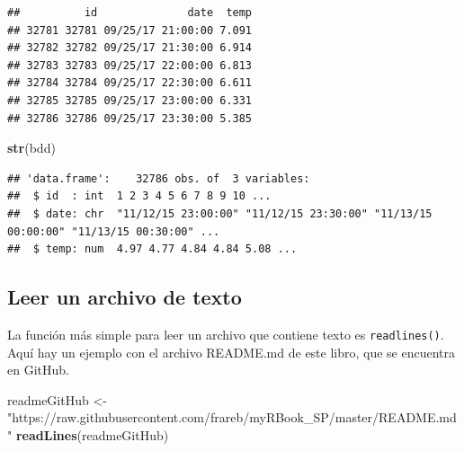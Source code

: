 \documentclass[
]{book}
\newenvironment{Shaded}{\begin{snugshade}}{\end{snugshade}}
\newcommand{\KeywordTok}[1]{\textcolor[rgb]{0.13,0.29,0.53}{\textbf{#1}}}
\newcommand{\NormalTok}[1]{#1}
\newcommand{\StringTok}[1]{\textcolor[rgb]{0.31,0.60,0.02}{#1}}
\begin{document}
\begin{verbatim}
##          id              date  temp
## 32781 32781 09/25/17 21:00:00 7.091
## 32782 32782 09/25/17 21:30:00 6.914
## 32783 32783 09/25/17 22:00:00 6.813
## 32784 32784 09/25/17 22:30:00 6.611
## 32785 32785 09/25/17 23:00:00 6.331
## 32786 32786 09/25/17 23:30:00 5.385
\end{verbatim}

\begin{Shaded}
\begin{Highlighting}[]
\KeywordTok{str}\NormalTok{(bdd)}
\end{Highlighting}
\end{Shaded}

\begin{verbatim}
## 'data.frame':    32786 obs. of  3 variables:
##  $ id  : int  1 2 3 4 5 6 7 8 9 10 ...
##  $ date: chr  "11/12/15 23:00:00" "11/12/15 23:30:00" "11/13/15 00:00:00" "11/13/15 00:30:00" ...
##  $ temp: num  4.97 4.77 4.84 4.84 5.08 ...
\end{verbatim}

\hypertarget{l016readTXT}{%
\subsection{Leer un archivo de texto}\label{l016readTXT}}

La función más simple para leer un archivo que contiene texto es \texttt{readlines()}. Aquí hay un ejemplo con el archivo README.md de este libro, que se encuentra en GitHub.

\begin{Shaded}
\begin{Highlighting}[]
\NormalTok{readmeGitHub <-}\StringTok{ "https://raw.githubusercontent.com/frareb/myRBook_SP/master/README.md"}
\KeywordTok{readLines}\NormalTok{(readmeGitHub)}
\end{Highlighting}
\end{Shaded}
\end{document}
